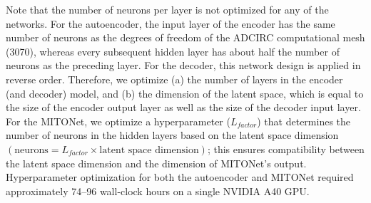 \documentclass[draft]{agujournal2019}
\begin{document}
Note that the number of neurons per layer is not optimized for any of the networks. For the autoencoder, the input layer of the encoder has the same number of neurons as the degrees of freedom of the ADCIRC computational mesh (3070), whereas every subsequent hidden layer has about half the number of neurons as the preceding layer. For the decoder, this network design is applied in reverse order. Therefore, we optimize (a) the number of layers in the encoder (and decoder) model, and (b) the dimension of the latent space, which is equal to the size of the encoder output layer as well as the size of the decoder input layer. For the MITONet, we optimize a hyperparameter (\(L_{factor}\)) that determines the number of neurons in the hidden layers based on the latent space dimension $(\text{neurons} = L_{factor} \times \text{latent space dimension})$; this ensures compatibility between the latent space dimension and the dimension of MITONet's output. Hyperparameter optimization for both the autoencoder and MITONet required approximately 74–96 wall-clock hours on a single NVIDIA A40 GPU. 
\end{document}
